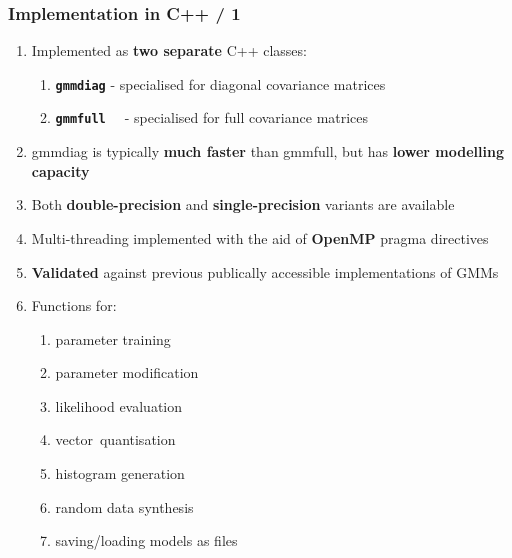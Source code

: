 \documentclass[usenames,dvipsnames]{beamer}
\def\_{{\tt\char95}}
\begin{document}
\begin{frame}
\frametitle{Implementation in C++ / 1}

\begin{enumerate}[{~~$\boldsymbol{\bullet}$}]

\item
Implemented as {\bf two separate} C++ classes:


\begin{enumerate}[{$\boldsymbol{\rightarrow}$}]
\renewcommand{\itemsep}{0.9ex}

\item
\texttt{\bf gmm\_diag} - specialised for diagonal covariance matrices

\item
\texttt{\bf gmm\_full~~} - specialised for full covariance matrices

\end{enumerate}
\vspace{1ex}

\item gmm\_diag is typically {\bf much faster} than gmm\_full, but has {\bf lower modelling capacity}
\vspace{1ex}

\item Both {\bf double-precision} and {\bf single-precision} variants are available
\vspace{1ex}

\item Multi-threading implemented with the aid of {\bf OpenMP} pragma directives
\vspace{1ex}

\item {\bf Validated} against previous publically accessible implementations of GMMs
\vspace{1ex}

\item 
Functions for:
%
\begin{enumerate}[{$\boldsymbol{\rightarrow}$}]
\scriptsize
\item parameter training
\item parameter modification
\item likelihood evaluation
\item vector~quantisation
\item histogram generation
\item random data synthesis
\item saving/loading models as files
\end{enumerate}
\vspace{1ex}


\end{enumerate}
\end{frame}
\end{document}

